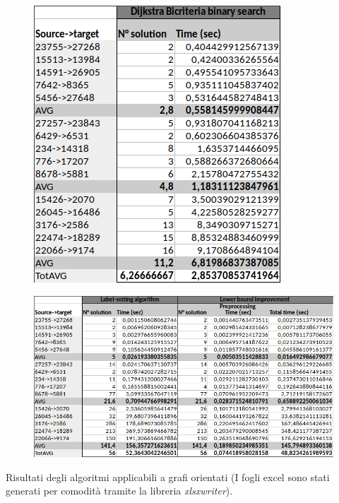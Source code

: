 \documentclass[a4paper,11pt]{report}
\begin{document}
\begin{table}
	\begin{figure}[H]
		\centering
		\includegraphics[scale=0.6, trim=0.2mm 0 0 0, clip]{biCriteriaExcelOutput1v2.png}
		\label{fig:worstCaseLabelSetting1}
		
		\vspace{3mm}
		
		\centering
		\includegraphics[width=\textwidth, trim=0.2mm 0 0 0.1mm, clip]{biCriteriaExcelOutput2v2.png}
		
		\label{fig:worstCaseLabelSetting2}
	\end{figure}
	\caption{Risultati degli algoritmi applicabili a grafi orientati (I fogli excel sono stati generati per comodità tramite la libreria \textit{xlsxwriter}).}
	\label{tab:BidirectionalOriented}
\end{table}
\end{document}
